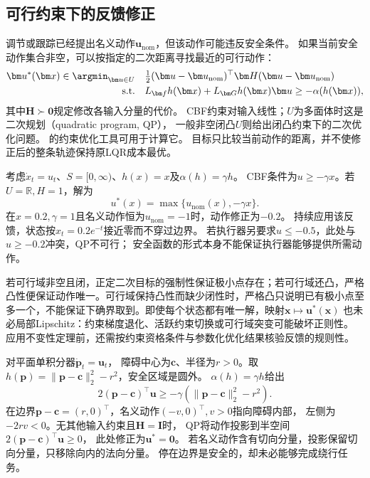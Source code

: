 \subsection{可行约束下的反馈修正}
调节或跟踪已经提出名义动作$\bm u_{\mathrm{nom}}$，但该动作可能违反安全条件。
如果当前安全动作集合非空，可以按指定的二次距离寻找最近的可行动作：
\begin{equation}
  \begin{aligned}
  \bm u^\ast(\bm x)\in\argmin_{\bm u\in U}\quad&
    \tfrac12(\bm u-\bm u_{\mathrm{nom}})^\top
              \bm H(\bm u-\bm u_{\mathrm{nom}})\\
  \text{s.t.}\quad&
    L_{\bm f}h(\bm x)+L_{\bm G}h(\bm x)\bm u
       \geq-\alpha(h(\bm x)),
  \end{aligned}
  \label{eq:control-cbf-qp}
\end{equation}
其中$\bm H\succ\bm0$规定修改各输入分量的代价。
CBF约束对输入线性；$U$为多面体时这是二次规划（quadratic program, QP），
一般非空闭凸$U$则给出闭凸约束下的二次优化问题。
的约束优化工具可用于计算它。
目标只比较当前动作的距离，并不使修正后的整条轨迹保持原LQR成本最优。

\begin{example}[一维积分器上的安全投影]
\label{ex:control-cbf-scalar-projection}
考虑$\dot x_t=u_t$、$S=[0,\infty)$、$h(x)=x$及$\alpha(h)=\gamma h$。
CBF条件为$u\geq-\gamma x$。若$U=\mathbb R,H=1$，解为
\begin{equation}
  u^\ast(x)=\max\{u_{\mathrm{nom}}(x),-\gamma x\}.
  \label{eq:control-cbf-scalar-projection}
\end{equation}
在$x=0.2,\gamma=1$且名义动作恒为$u_{\mathrm{nom}}=-1$时，动作修正为$-0.2$。
持续应用该反馈，状态按$x_t=0.2e^{-t}$接近零而不穿过边界。
若执行器另要求$u\leq-0.5$，此处与$u\geq-0.2$冲突，QP不可行；
安全函数的形式本身不能保证执行器能够提供所需动作。
\end{example}

若可行域非空且闭，正定二次目标的强制性保证极小点存在；若可行域还凸，严格凸性便保证动作唯一。可行域保持凸性而缺少闭性时，严格凸只说明已有极小点至多一个，不能保证下确界取到。即使每个状态都有唯一解，映射$\bm x\mapsto\bm u^\ast(\bm x)$
也未必局部Lipschitz：约束梯度退化、活跃约束切换或可行域突变可能破坏正则性。
应用不变性定理前，还需按约束资格条件与参数化优化结果核验反馈的规则性。

\begin{example}[圆形障碍外的安全修正]
\label{ex:control-cbf-obstacle}
对平面单积分器$\dot{\bm p}_t=\bm u_t$，
障碍中心为$\bm c$、半径为$r>0$。取
$h(\bm p)=\|\bm p-\bm c\|_2^2-r^2$，安全区域是圆外。
$\alpha(h)=\gamma h$给出
\begin{equation}
  2(\bm p-\bm c)^\top\bm u
  \geq-\gamma(\|\bm p-\bm c\|_2^2-r^2).
  \label{eq:control-cbf-obstacle-constraint}
\end{equation}
在边界$\bm p-\bm c=(r,0)^\top$，名义动作$(-v,0)^\top,v>0$指向障碍内部，
左侧为$-2rv<0$。无其他输入约束且$\bm H=\bm I$时，
QP将动作投影到半空间$2(\bm p-\bm c)^\top\bm u\geq0$，
此处修正为$\bm u^\ast=\bm0$。
若名义动作含有切向分量，投影保留切向分量，只移除向内的法向分量。
停在边界是安全的，却未必能够完成绕行任务。
\end{example}

